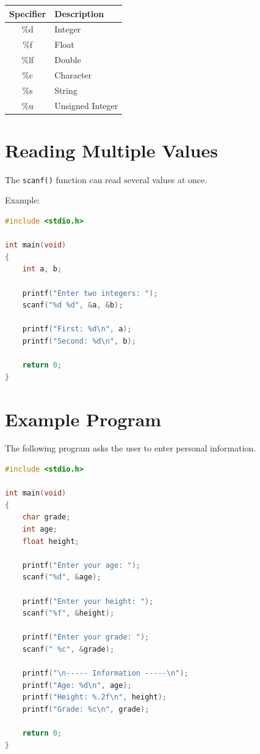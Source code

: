 \documentclass[12pt,openany]{book}
\begin{document}
\begin{center}
\begin{tabular}{|c|l|}
\hline
\textbf{Specifier} & \textbf{Description} \\
\hline
\%d & Integer \\
\hline
\%f & Float \\
\hline
\%lf & Double \\
\hline
\%c & Character \\
\hline
\%s & String \\
\hline
\%u & Unsigned Integer \\
\hline
\end{tabular}
\end{center}

\section{Reading Multiple Values}

The \texttt{scanf()} function can read several values at once.

Example:

\begin{lstlisting}[language=C]
#include <stdio.h>

int main(void)
{
    int a, b;

    printf("Enter two integers: ");
    scanf("%d %d", &a, &b);

    printf("First: %d\n", a);
    printf("Second: %d\n", b);

    return 0;
}
\end{lstlisting}

\section{Example Program}

The following program asks the user to enter personal information.

\begin{lstlisting}[language=C]
#include <stdio.h>

int main(void)
{
    char grade;
    int age;
    float height;

    printf("Enter your age: ");
    scanf("%d", &age);

    printf("Enter your height: ");
    scanf("%f", &height);

    printf("Enter your grade: ");
    scanf(" %c", &grade);

    printf("\n----- Information -----\n");
    printf("Age: %d\n", age);
    printf("Height: %.2f\n", height);
    printf("Grade: %c\n", grade);

    return 0;
}
\end{lstlisting}
\end{document}
